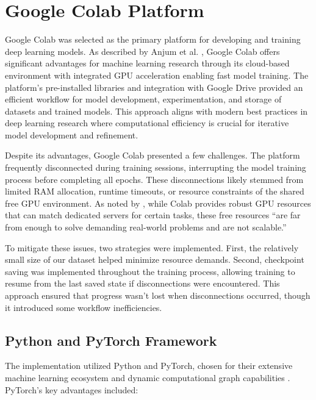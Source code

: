 \documentclass[a4paper,12pt]{report}
\begin{document}
\section{Google Colab Platform}

Google Colab was selected as the primary platform for developing and training deep learning models. As described by Anjum et al. \citet{anjum2021}, Google Colab offers significant advantages for machine learning research through its cloud-based environment with integrated GPU acceleration enabling fast model training. The platform's pre-installed libraries and integration with Google Drive provided an efficient workflow for model development, experimentation, and storage of datasets and trained models. This approach aligns with modern best practices in deep learning research where computational efficiency is crucial for iterative model development and refinement.

Despite its advantages, Google Colab presented a few challenges. The platform frequently disconnected during training sessions, interrupting the model training process before completing all epochs. These disconnections likely stemmed from limited RAM allocation, runtime timeouts, or resource constraints of the shared free GPU environment. As noted by \citet{carneiro2018}, while Colab provides robust GPU resources that can match dedicated servers for certain tasks, these free resources ``are far from enough to solve demanding real-world problems and are not scalable.''

To mitigate these issues, two strategies were implemented. First, the relatively small size of our dataset helped minimize resource demands. Second, checkpoint saving was implemented throughout the training process, allowing training to resume from the last saved state if disconnections were encountered. This approach ensured that progress wasn't lost when disconnections occurred, though it introduced some workflow inefficiencies.


\subsection{Python and PyTorch Framework}

The implementation utilized Python and PyTorch, chosen for their extensive machine learning ecosystem and dynamic computational graph capabilities \citep{geron2019}. PyTorch's key advantages included:
\end{document}

